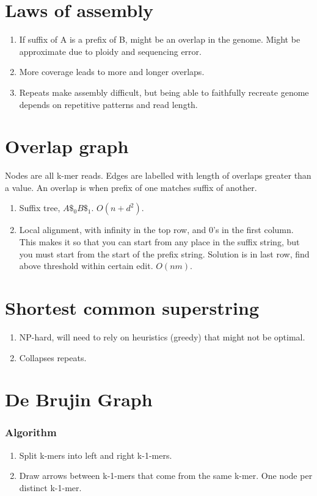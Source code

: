 \documentclass{article}
\begin{document}
\section{Laws of assembly}
\begin{enumerate}
    \item If suffix of A is a prefix of B, might be an overlap in the genome. Might be approximate due to ploidy and sequencing error.
    \item More coverage leads to more and longer overlaps.
    \item Repeats make assembly difficult, but being able to faithfully recreate genome depends on repetitive patterns and read length.
\end{enumerate}

\section{Overlap graph}
Nodes are all k-mer reads. Edges are labelled with length of overlaps greater than a value. An overlap is when prefix of one matches suffix of another.
\begin{enumerate}
    \item Suffix tree, $A\$_0B\$_1$. $O(n+d^2)$.
    \item Local alignment, with infinity in the top row, and 0's in the first column. This makes it so that you can start from any place in the suffix string, but you must start from the start of the prefix string. Solution is in last row, find above threshold within certain edit. $O(nm)$.
\end{enumerate}

\section{Shortest common superstring}
\begin{enumerate}
    \item NP-hard, will need to rely on heuristics (greedy) that might not be optimal.
    \item Collapses repeats.
\end{enumerate}

\section{De Brujin Graph}
\subsubsection*{Algorithm}
\begin{enumerate}
    \item Split k-mers into left and right k-1-mers.
    \item Draw arrows between k-1-mers that come from the same k-mer. One node per distinct k-1-mer.
\end{enumerate}{}
\end{document}
